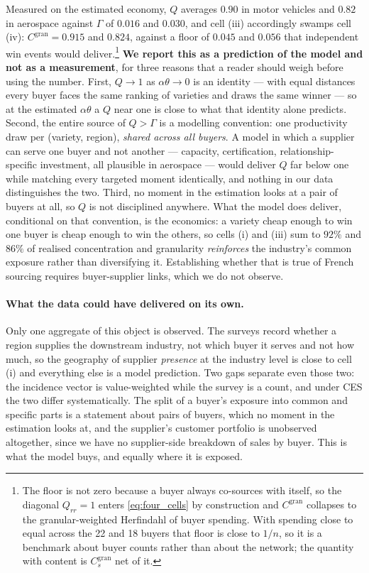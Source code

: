 Measured on the estimated economy, $Q$ averages $0.90$ in motor vehicles and $0.82$ in aerospace against $\Gamma$ of $0.016$ and $0.030$, and cell (iii) accordingly swamps cell (iv): $C^{\text{gran}}=0.915$ and $0.824$, against a floor of $0.045$ and $0.056$ that independent win events would deliver.\footnote{The floor is not zero because a buyer always co-sources with itself, so the diagonal $Q_{rr}=1$ enters \eqref{eq:four_cells} by construction and $C^{\text{gran}}$ collapses to the granular-weighted Herfindahl of buyer spending. With spending close to equal across the 22 and 18 buyers that floor is close to $1/n$, so it is a benchmark about buyer counts rather than about the network; the quantity with content is $C^{\text{gran}}_{s}$ net of it.} \textbf{We report this as a prediction of the model and not as a measurement}, for three reasons that a reader should weigh before using the number. First, $Q\to1$ as $\alpha\theta\to0$ is an identity --- with equal distances every buyer faces the same ranking of varieties and draws the same winner --- so at the estimated $\alpha\theta$ a $Q$ near one is close to what that identity alone predicts. Second, the entire source of $Q>\Gamma$ is a modelling convention: one productivity draw per (variety, region), \emph{shared across all buyers}. A model in which a supplier can serve one buyer and not another --- capacity, certification, relationship-specific investment, all plausible in aerospace --- would deliver $Q$ far below one while matching every targeted moment identically, and nothing in our data distinguishes the two. Third, no moment in the estimation looks at a pair of buyers at all, so $Q$ is not disciplined anywhere. What the model does deliver, conditional on that convention, is the economics: a variety cheap enough to win one buyer is cheap enough to win the others, so cells (i) and (iii) sum to $92\%$ and $86\%$ of realised concentration and granularity \emph{reinforces} the industry's common exposure rather than diversifying it. Establishing whether that is true of French sourcing requires buyer-supplier links, which we do not observe.

\paragraph{What the data could have delivered on its own.}
Only one aggregate of this object is observed. The surveys record whether a region supplies the downstream industry, not which buyer it serves and not how much, so the geography of supplier \emph{presence} at the industry level is close to cell (i) and everything else is a model prediction. Two gaps separate even those two: the incidence vector is value-weighted while the survey is a count, and under CES the two differ systematically. The split of a buyer's exposure into common and specific parts is a statement about pairs of buyers, which no moment in the estimation looks at, and the supplier's customer portfolio is unobserved altogether, since we have no supplier-side breakdown of sales by buyer. This is what the model buys, and equally where it is exposed.


